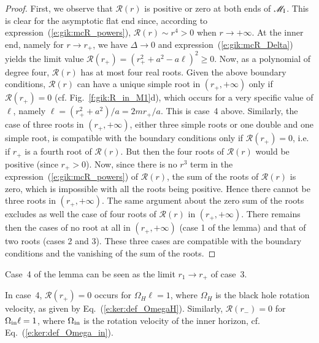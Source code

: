 \begin{proof}
First, we observe that $\mathcal{R}(r)$ is positive or zero at both
ends of $\mathscr{M}_{\rm I}$. This is clear
for the asymptotic flat end since, according to expression~(\ref{e:gik:mcR_powers}),
$\mathcal{R}(r) \sim r^4 > 0$ when $r\to +\infty$. At the inner end,
namely for $r \to r_+$,
we have $\Delta \to 0$ and expression~(\ref{e:gik:mcR_Delta}) yields the limit value
$\mathcal{R}(r_+) = (r_+^2 + a^2 - a \ell)^2 \geq 0$.
Now, as a polynomial of degree four, $\mathcal{R}(r)$ has at most four real roots.
Given the above boundary conditions, $\mathcal{R}(r)$ can have
a unique simple root in $(r_+,+\infty)$ only if $\mathcal{R}(r_+) = 0$ (cf. Fig.~\ref{f:gik:R_in_M1}d),
which occurs for a very specific value of $\ell$, namely $\ell = (r_+^2 + a^2)/a = 2 m r_+/a$.
This is case~4 above.
Similarly, the case of three roots in $(r_+,+\infty)$, either three simple roots or one double and one simple root,
is compatible with the boundary conditions only if $\mathcal{R}(r_+) = 0$, i.e.
if $r_+$ is a fourth root of $\mathcal{R}(r)$.
But then the four roots of $\mathcal{R}(r)$ would be positive (since $r_+ > 0$).
Now, since there is no $r^3$ term in the expression~(\ref{e:gik:mcR_powers}) of $\mathcal{R}(r)$,
the sum of the roots of $\mathcal{R}(r)$ is zero, which is impossible with all
the roots being positive. Hence there cannot be three roots in $(r_+,+\infty)$.
The same argument about the zero sum of the roots excludes as well the case
of four roots of $\mathcal{R}(r)$ in $(r_+,+\infty)$.
There remains then the cases of no root at all in  $(r_+,+\infty)$ (case 1 of the lemma) and that of two
roots (cases 2 and 3). These three cases are compatible
with the boundary conditions and the vanishing of the sum of the roots.
\end{proof}

\begin{remark}
Case~4 of the lemma can be seen as the limit $r_1\to r_+$ of case~3.
\end{remark}

\begin{remark}
In case~4, $\mathcal{R}(r_+) = 0$ occurs for $\Omega_H \ell = 1$, where $\Omega_H$ is the black hole
rotation velocity,
as given by Eq.~(\ref{e:ker:def_OmegaH}). Similarly, $\mathcal{R}(r_-) = 0$ for $\Omega_{\rm in} \ell = 1$,
where $\Omega_{\rm in}$ is the rotation velocity of the inner horizon, cf. Eq.~(\ref {e:ker:def_Omega_in}).
\end{remark}

